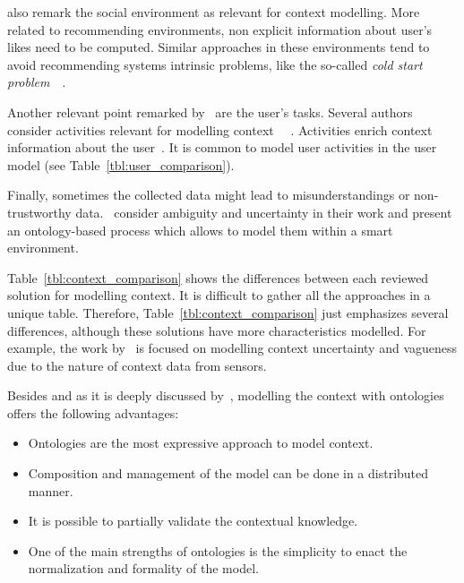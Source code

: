 \citet{schmidt_there_1999} also remark the social environment as relevant for 
context modelling. More related to recommending environments, non explicit 
information about user's likes need to be computed. Similar approaches in these 
environments tend to avoid recommending systems intrinsic problems, like the 
so-called \textit{cold start problem}~\citep{castillejo_alleviating_2012}~\citep{castillejo_social_2012}.

Another relevant point remarked by~\citet{schmidt_there_1999} are the user's tasks.
Several authors consider activities relevant for modelling context 
\citep{henricksen_modeling_2002}~\citep{gu_toward_2004}~\citep{abowd_towards_1999}.
Activities enrich context information about the user~\citep{razmerita_ontology_based_2003}.
It is common to model user activities in the user model (see Table~\ref{tbl:user_comparison}). 

Finally, sometimes the collected data might lead to misunderstandings or 
non-trustworthy data.~\citet{almeida_assessing_2012} consider ambiguity and 
uncertainty in their work and present an ontology-based process which allows to 
model them within a smart environment.

Table~\ref{tbl:context_comparison} shows the differences between each reviewed
solution for modelling context. It is difficult to gather all the approaches in a
unique table. Therefore, Table~\ref{tbl:context_comparison} just emphasizes several
differences, although these solutions have more characteristics modelled. For example,
the work by~\citet{almeida_assessing_2012} is focused on modelling context uncertainty
and vagueness due to the nature of context data from sensors.

Besides and as it is deeply discussed by~\citet{strang_context_2004}, modelling 
the context with ontologies offers the following advantages:
\begin{itemize}
  \item Ontologies are the most expressive approach to model context.
  \item Composition and management of the model can be done in a distributed
  manner.
  \item It is possible to partially validate the contextual knowledge.
  \item One of the main strengths of ontologies is the simplicity to enact the
  normalization and formality of the model.
\end{itemize}

